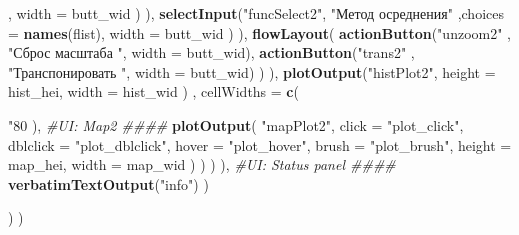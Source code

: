 \documentclass[]{article}
\newenvironment{Shaded}{\begin{snugshade}}{\end{snugshade}}
\newcommand{\KeywordTok}[1]{\textcolor[rgb]{0.13,0.29,0.53}{\textbf{#1}}}
\newcommand{\DataTypeTok}[1]{\textcolor[rgb]{0.13,0.29,0.53}{#1}}
\newcommand{\StringTok}[1]{\textcolor[rgb]{0.31,0.60,0.02}{#1}}
\newcommand{\CommentTok}[1]{\textcolor[rgb]{0.56,0.35,0.01}{\textit{#1}}}
\newcommand{\NormalTok}[1]{#1}
\begin{document}
\begin{Shaded}
\begin{Highlighting}[]
{\NormalTok{                             , }\DataTypeTok{width =}\NormalTok{ butt_wid}
\NormalTok{                  )}
\NormalTok{                ),}
                \KeywordTok{selectInput}\NormalTok{(}\StringTok{"funcSelect2"}\NormalTok{, }\StringTok{"Метод осреднения"}
\NormalTok{                            ,}\DataTypeTok{choices =} \KeywordTok{names}\NormalTok{(flist), }\DataTypeTok{width =}\NormalTok{ butt_wid}
\NormalTok{                )}
\NormalTok{              ),}
              \KeywordTok{flowLayout}\NormalTok{(}
                \KeywordTok{actionButton}\NormalTok{(}\StringTok{"unzoom2"}\NormalTok{   , }\StringTok{"Сброс масштаба  "}\NormalTok{, }\DataTypeTok{width =}\NormalTok{ butt_wid),}
                \KeywordTok{actionButton}\NormalTok{(}\StringTok{"trans2"}\NormalTok{    , }\StringTok{"Транспонировать "}\NormalTok{, }\DataTypeTok{width =}\NormalTok{ butt_wid)}
\NormalTok{              )}
\NormalTok{            ),}
            \KeywordTok{plotOutput}\NormalTok{(}\StringTok{"histPlot2"}\NormalTok{,  }
                       \DataTypeTok{height =}\NormalTok{ hist_hei,}
                       \DataTypeTok{width =}\NormalTok{ hist_wid}
\NormalTok{            )}
\NormalTok{            , }\DataTypeTok{cellWidths =} \KeywordTok{c}\NormalTok{(}\StringTok{"80%"}\NormalTok{,}\StringTok{"20%"}\NormalTok{)}
\NormalTok{          ),}
          \CommentTok{#UI: Map2 ####}
          \KeywordTok{plotOutput}\NormalTok{(}
            \StringTok{"mapPlot2"}\NormalTok{,}
            \DataTypeTok{click =} \StringTok{"plot_click"}\NormalTok{,}
            \DataTypeTok{dblclick =} \StringTok{"plot_dblclick"}\NormalTok{,}
            \DataTypeTok{hover =} \StringTok{"plot_hover"}\NormalTok{,}
            \DataTypeTok{brush =} \StringTok{"plot_brush"}\NormalTok{,}
            \DataTypeTok{height =}\NormalTok{ map_hei,}
            \DataTypeTok{width =}\NormalTok{ map_wid}
\NormalTok{          )}
\NormalTok{        )}
\NormalTok{        )}
\NormalTok{      ),}
      \CommentTok{#UI: Status panel ####}
      \KeywordTok{verbatimTextOutput}\NormalTok{(}\StringTok{"info"}\NormalTok{)}
\NormalTok{    )}
    
\NormalTok{  )}
\NormalTok{)}

}}
\end{Highlighting}
\end{Shaded}
\end{document}
